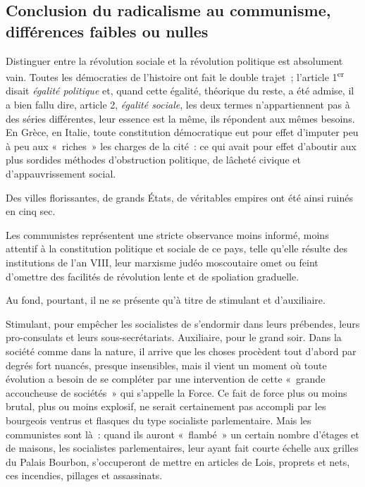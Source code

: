 \documentclass[french,twoside]{book} %
\newcommand{\astermono}{\medskip\centerline{\color{rubric}\large\selectfont{\syms ✻}}\medskip\par}%
\begin{document}
\astermono

\subsection[{Conclusion du radicalisme au communisme, différences faibles ou nulles}]{Conclusion du radicalisme au communisme, différences faibles ou nulles}
\noindent Distinguer entre la révolution sociale et la révolution politique est absolument vain. Toutes les démocraties de l’histoire ont fait le double trajet ; l’article 1\textsuperscript{er} disait \emph{égalité politique} et, quand cette égalité, théorique du reste, a été admise, il a bien fallu dire, article 2, \emph{égalité sociale}, les deux termes n’appartiennent pas à des séries différentes, leur essence est la même, ils répondent aux mêmes besoins. En Grèce, en Italie, toute constitution démocratique eut pour effet d’imputer peu à peu aux « riches » les charges de la cité : ce qui avait pour effet d’aboutir aux plus sordides méthodes d’obstruction politique, de lâcheté civique et d’appauvrissement social.\par
Des villes florissantes, de grands États, de véritables empires ont été ainsi ruinés en cinq sec.\par

\astermono

\noindent Les communistes représentent une stricte observance moins informé, moins attentif à la constitution politique et sociale de ce pays, telle qu’elle résulte des institutions de l’an VIII, leur marxisme judéo moscoutaire omet ou feint d’omettre des facilités de révolution lente et de spoliation graduelle.\par
Au fond, pourtant, il ne se présente qu’à titre de stimulant et d’auxiliaire.\par
Stimulant, pour empêcher les socialistes de s’endormir dans leurs prébendes, leurs pro-consulats et leurs sous-secrétariats. Auxiliaire, pour le grand soir. Dans la société comme dans la nature, il arrive que les choses procèdent tout d’abord par degrés fort nuancés, presque insensibles, mais il vient un moment où toute évolution a besoin de se compléter par une intervention de cette « grande accoucheuse de sociétés » qui s’appelle la Force. Ce fait de force plus ou moins brutal, plus ou moins explosif, ne serait certainement pas accompli par les bourgeois ventrus et flasques du type socialiste parlementaire. Mais les communistes sont là : quand ils auront « flambé » un certain nombre d’étages et de maisons, les socialistes parlementaires, leur ayant fait courte échelle aux grilles du Palais Bourbon, s’occuperont de mettre en articles de Lois, proprets et nets, ces incendies, pillages et assassinats.\par
\end{document}
